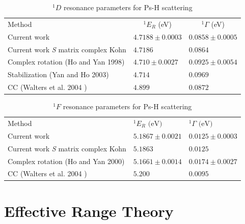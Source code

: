 \documentclass[preprint,showpacs,showkeys,preprintnumbers,amsmath,amssymb,longbibliography,pra,aps]{revtex4-1}
\newcommand*{\thead}[1]{\multicolumn{1}{c}{#1}}
\begin{document}
\begin{table}[H]
\begin{center}
\begin{ruledtabular}
\begin{tabular}{l l l}
Method & \thead{$^1E_R$ (eV)} & \thead{$^1\Gamma$ (eV)} \\
\colrule
Current work & $4.7188 \pm 0.0003$ & $0.0858 \pm 0.0005$ \\
Current work \emph{S} matrix complex Kohn & $4.7186$ & $0.0864$ \\
Complex rotation (Ho and Yan 1998) \cite{Ho1998} & $4.710 \pm 0.0027$ & $0.0925 \pm 0.0054$  \\
Stabilization (Yan and Ho 2003) \cite{Yan2003} & $4.714$ & $0.0969$ \\
CC (Walters et al. 2004 \cite{Walters2004}) & $4.899$ & $0.0872$ \\
\end{tabular}
\end{ruledtabular}
\caption{$^1D$ resonance parameters for Ps-H scattering}
\label{tab:DWaveResonances}
\end{center}
\end{table}


\begin{table}[H]
\begin{center}
\begin{ruledtabular}
\begin{tabular}{l l l}
Method & $^1E_R \text{ (eV)}$ & $^1\Gamma \text{ (eV)}$ \\
\colrule
Current work & $5.1867 \pm 0.0021$ & $0.0125 \pm 0.0003$ \\
Current work \emph{S} matrix complex Kohn & $5.1863$ & $0.0125$ \\
Complex rotation (Ho and Yan 2000) \cite{Ho2000} & $5.1661 \pm 0.0014$ & $0.0174 \pm 0.0027$  \\
CC (Walters et al. 2004 \cite{Walters2004}) & $5.200$ & $0.0095$ \\
\end{tabular}
\end{ruledtabular}
\caption{$^1F$ resonance parameters for Ps-H scattering}
\label{tab:FWaveResonances}
\end{center}
\end{table}



\section{Effective Range Theory}
\end{document}
